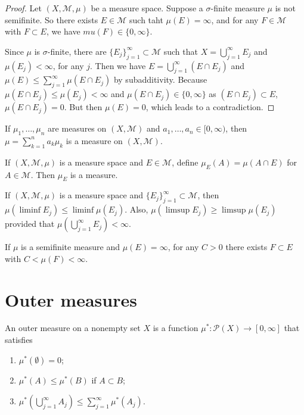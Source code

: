 \begin{proof}
    Let $(X, \mathcal{M}, \mu)$ be a measure space.
    Suppose a $\sigma$-finite measure $\mu$ is not semifinite.
    So there exists $E \in \mathcal{M}$ such taht $\mu(E) = \infty$, and for any $F \in \mathcal{M}$ with $F \subset E$, we have $mu(F) \in \{ 0, \infty \}$.

    Since $\mu$ is $\sigma$-finite, there are $\{ E_j \}_{j=1}^{\infty} \subset \mathcal{M}$ such that $X = \bigcup_{j=1}^{\infty} E_j$ and $\mu(E_j) < \infty$, for any $j$.
    Then we have $E = \bigcup_{j=1}^{\infty} (E \cap E_j)$ and $\mu(E) \le \sum_{j=1}^{\infty} \mu(E \cap E_j)$ by subadditivity.
    Because $\mu(E \cap E_j) \le \mu(E_j) < \infty$ and $\mu(E \cap E_j) \in \{ 0, \infty \}$ as $(E \cap E_j) \subset E$, $\mu(E \cap E_j) = 0$.
    But then $\mu(E) = 0$, which leads to a contradiction.
\end{proof}

\begin{proposition}
    If $\mu_1, \dots, \mu_n$ are measures on $(X, \mathcal{M})$ and $a_1, \dots, a_n \in [0, \infty)$, then $\mu = \sum_{k=1}^{n} a_k \mu_k$ is a measure on $(X, \mathcal{M})$.
\end{proposition}

\begin{proposition}
    If $(X, \mathcal{M}, \mu)$ is a measure space and $E \in \mathcal{M}$, define $\mu_E(A) = \mu(A \cap E)$ for $A \in \mathcal{M}$.
    Then $\mu_E$ is a measure.
\end{proposition}

\begin{proposition}
    If $(X, \mathcal{M}, \mu)$ is a measure space and $\{ E_j \}_{j=1}^{\infty} \subset \mathcal{M}$, then $\mu(\liminf E_j) \le \liminf \mu(E_j)$.
    Also, $\mu(\limsup E_j) \ge \limsup \mu(E_j)$ provided that $\mu(\bigcup_{j=1}^{\infty} E_j) < \infty$.
\end{proposition}

\begin{proposition}
    If $\mu$ is a semifinite measure and $\mu(E) = \infty$, for any $C > 0$ there exists $F \subset E$ with $C < \mu(F) < \infty$.
\end{proposition}

\section{Outer measures}

\begin{definition}
    An outer measure on a nonempty set $X$ is a function $\mu^*: \mathcal{P}(X) \to [0, \infty]$ that satisfies
    \begin{enumerate}
        \item $\mu^*(\emptyset) = 0$;
        \item $\mu^*(A) \le \mu^*(B)$ if $A \subset B$;
        \item $\mu^*(\bigcup_{j=1}^{\infty} A_j) \le \sum_{j=1}^{\infty} \mu^*(A_j)$.
    \end{enumerate}
\end{definition}

